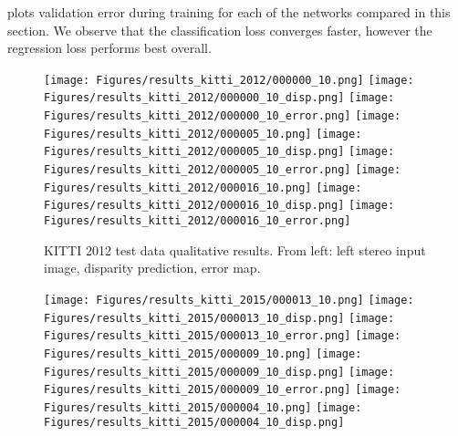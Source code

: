 \documentclass[10pt,twocolumn,letterpaper]{article}
\begin{document}
 plots validation error during training for each of the networks compared in this section. We observe that the classification loss converges faster, however the regression loss performs best overall.

\begin{figure*}[p]
	\begin{center}
            \vspace{-5 mm}
    		\begin{subfigure}[t]{\linewidth}
            \centering
			\texttt{[image: Figures/results\_kitti\_2012/000000\_10.png]}
			\texttt{[image: Figures/results\_kitti\_2012/000000\_10\_disp.png]}
			\texttt{[image: Figures/results\_kitti\_2012/000000\_10\_error.png]}
            \vspace{1 mm}
			\texttt{[image: Figures/results\_kitti\_2012/000005\_10.png]}
			\texttt{[image: Figures/results\_kitti\_2012/000005\_10\_disp.png]}
			\texttt{[image: Figures/results\_kitti\_2012/000005\_10\_error.png]}
            \vspace{1 mm}
			\texttt{[image: Figures/results\_kitti\_2012/000016\_10.png]}
			\texttt{[image: Figures/results\_kitti\_2012/000016\_10\_disp.png]}
			\texttt{[image: Figures/results\_kitti\_2012/000016\_10\_error.png]}
	        \caption{KITTI 2012 test data qualitative results. From left: left stereo input image, disparity prediction, error map.}
            \vspace{2 mm}
		\end{subfigure}
    		\begin{subfigure}[t]{\linewidth}
            \centering
			\texttt{[image: Figures/results\_kitti\_2015/000013\_10.png]}
			\texttt{[image: Figures/results\_kitti\_2015/000013\_10\_disp.png]}
			\texttt{[image: Figures/results\_kitti\_2015/000013\_10\_error.png]}
            \vspace{1 mm}
			\texttt{[image: Figures/results\_kitti\_2015/000009\_10.png]}
			\texttt{[image: Figures/results\_kitti\_2015/000009\_10\_disp.png]}
			\texttt{[image: Figures/results\_kitti\_2015/000009\_10\_error.png]}
            \vspace{1 mm}
			\texttt{[image: Figures/results\_kitti\_2015/000004\_10.png]}
			\texttt{[image: Figures/results\_kitti\_2015/000004\_10\_disp.png]}

\end{subfigure}
\end{center}
\end{figure*}
\end{document}
